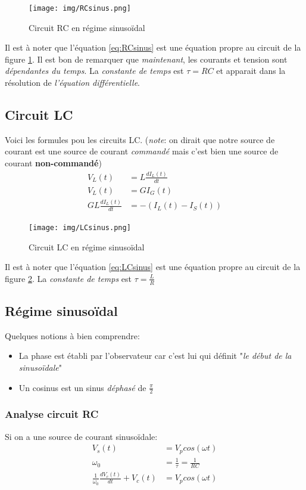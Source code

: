 \documentclass{report}
\begin{document}
\begin{figure}[H]
\centering
\texttt{[image: img/RCsinus.png]} \label{img:RCsinus}
\caption{Circuit RC en régime sinusoïdal}
\end{figure}

Il est à noter que l'équation \ref{eq:RCsinus} est une équation propre au circuit de la figure \ref{img:RCsinus}. Il est bon de remarquer que \textit{maintenant}, les courants et tension sont \textit{dépendantes du temps}. La \textit{constante de temps} est $\tau = RC$ et apparait dans la résolution de \textit{l'équation différentielle}.

\subsection{Circuit LC}
Voici les formules pou les circuits LC. (\textit{note}: on dirait que notre source de courant est une source de courant \textit{commandé} mais c'est bien une source de courant \textbf{non-commandé})
\begin{align}
V_L(t) &= L \frac{dI_L(t)}{dt}\\
V_L(t) &= GI_G(t)\\
GL \frac{dI_L(t)}{dt} &= -(I_L(t)-I_S(t))\label{eq:LCsinus}
\end{align}

\begin{figure}[H]
\centering
\texttt{[image: img/LCsinus.png]} \label{img:LCsinus}
\caption{Circuit LC en régime sinusoïdal}
\end{figure}

Il est à noter que l'équation \ref{eq:LCsinus} est une équation propre au circuit de la figure \ref{img:LCsinus}. La \textit{constante de temps} est $\tau = \frac{L}{R}$

\subsection{Régime sinusoïdal}
Quelques notions à bien comprendre:
\begin{itemize}
\item La phase est établi par l'observateur car c'est lui qui définit "\textit{le début de la sinusoïdale}"
\item Un cosinus est un sinus \textit{déphasé} de $\frac{\pi}{2}$
\end{itemize}

\subsubsection{Analyse circuit RC}
Si on a une source de courant sinusoïdale:
\begin{align}
V_s(t) &= V_p cos(\omega t)\\
\omega_0 &= \frac{1}{\tau} = \frac{1}{RC}\\
\frac{1}{\omega_0}\frac{dV_c(t)}{dt} + V_c(t) &= V_p cos(\omega t) \label{eq:RCdiff}
\end{align}
\end{document}
